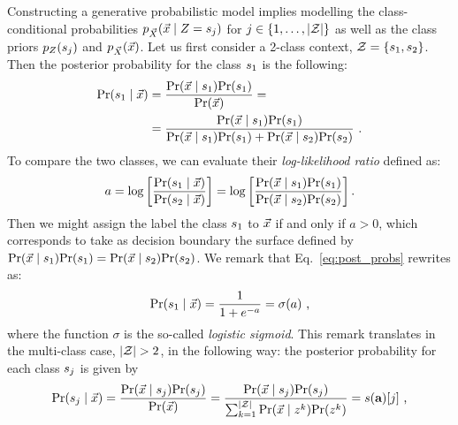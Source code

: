 Constructing a generative probabilistic model implies modelling the class-conditional probabilities $\pdf_{\vaLeakVec}(\given{\vLeakVec}{\sensRandVar = \sensVarValue{j}})$ for $j\in \{1,\dots,\lvert\mathcal{Z}\rvert\}$ as well as the class priors $p_{Z}(s_{j})$ and $p_{\vec{X}}(\vec{x})$. Let us first consider a 2-class context, \ie $\mathcal{Z} = \{s_{1}, s_{2}\}$. Then the posterior probability for the class $s_{1}$ is the following:
\begin{align}\label{eq:post_probs}
\prob(\given{\sensVarValue{1}}{\vLeakVec}) &= \frac{\prob(\given{\vLeakVec}{\sensVarValue{1}})\prob(\sensVarValue{1})}{\prob(\vLeakVec)}=\\
&=\frac{\prob(\given{\vLeakVec}{\sensVarValue{1}})\prob(\sensVarValue{1})}{\prob(\given{\vLeakVec}{\sensVarValue{1}})\prob(\sensVarValue{1}) + \prob(\given{\vLeakVec}{\sensVarValue{2}})\prob(\sensVarValue{2})}\mbox{ .}
\end{align}
To compare the two classes, we can evaluate their \emph{log-likelihood ratio} defined as:
\begin{equation}\label{eq:log-ratio}
a = \log\left[\frac{\prob(\given{\sensVarValue{1}}{\vLeakVec})}{\prob(\given{\sensVarValue{2}}{\vLeakVec})}\right] =  \log\left[\frac{\prob(\given{\vLeakVec}{\sensVarValue{1}})\prob(\sensVarValue{1})}{\prob(\given{\vLeakVec}{\sensVarValue{2}})\prob(\sensVarValue{2})}\right].
\end{equation}
Then we might assign the label the class $s_{1}$ to $\vec{x}$  if and only if $a>0$, which corresponds to take as decision boundary the surface defined by $\prob(\given{\vLeakVec}{\sensVarValue{1}})\prob(\sensVarValue{1}) = \prob(\given{\vLeakVec}{\sensVarValue{2}})\prob(\sensVarValue{2})$.
We remark that Eq.~\eqref{eq:post_probs} rewrites as:
\begin{equation}\label{eq:post_probs_sigmoid}
\prob(\given{\sensVarValue{1}}{\vLeakVec}) = \frac{1}{1+e^{-a}} = \sigma(a)\mbox{ ,}
\end{equation}
where the function $\sigma$ is the so-called \emph{logistic sigmoid}. This remark translates in the multi-class case, \ie $\lvert\mathcal{Z}\rvert >2$, in the following way: the posterior probability for each class $s_{j}$ is given by
\begin{equation}\label{eq:post_probs_multi-class}
\prob(\given{\sensVarValue{j}}{\vLeakVec})  = \frac{\prob(\given{\vLeakVec}{\sensVarValue{j}})\prob(\sensVarValue{j})}{\prob(\vLeakVec)} = \frac{\prob(\given{\vLeakVec}{\sensVarValue{j}})\prob(\sensVarValue{j})}{\sum_{k=1}^{\nbClasses}\prob(\given{\vLeakVec}{\sensVar^k})\prob(\sensVar^k )} = \softmax (\aaa)[j]\mbox{ ,}
\end{equation}
